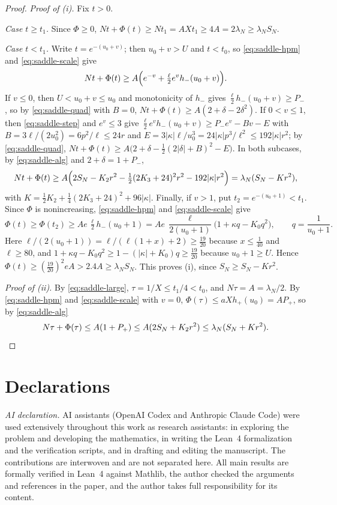 \documentclass[11pt]{article}
\theoremstyle{remark}
\begin{document}
\begin{proof}
\emph{Proof of (i).} Fix $t>0$.

\emph{Case $t\ge t_1$.} Since $\Phi\ge0$,
$Nt+\Phi(t)\ge Nt_1=AXt_1\ge4A=2\lambda_N\ge\lambda_NS_N$.

\emph{Case $t<t_1$.} Write $t=e^{-(u_0+v)}$; then $u_0+v>U$ and
$t<t_0$, so \eqref{eq:saddle-hpm} and \eqref{eq:saddle-scale} give
\[
  Nt+\Phi(t)\ge A\Bigl(e^{-v}+\tfrac\ell2e^vh_-(u_0+v)\Bigr).
\]
If $v\le0$, then $U<u_0+v\le u_0$ and monotonicity of $h_-$ gives
$\frac\ell2h_-(u_0+v)\ge P_-$, so by \eqref{eq:saddle-quad} with $B=0$,
$Nt+\Phi(t)\ge A(2+\delta-2\delta^2)$. If $0<v\le1$, then
\eqref{eq:saddle-step} and $e^v\le3$ give
$\frac\ell2e^vh_-(u_0+v)\ge P_-e^v-Bv-E$ with
$B=3\ell/(2u_0^2)=6p^2/\ell\le24r$ and
$E=3|\kappa|\ell/u_0^3=24|\kappa|p^3/\ell^2\le192|\kappa|r^2$; by
\eqref{eq:saddle-quad},
$Nt+\Phi(t)\ge A\bigl(2+\delta-\frac12(2|\delta|+B)^2-E\bigr)$. In both
subcases, by \eqref{eq:saddle-alg} and $2+\delta=1+P_-$,
\[
  Nt+\Phi(t)\ge A\Bigl(2S_N-K_2r^2-\tfrac12(2K_3+24)^2r^2
  -192|\kappa|r^2\Bigr)=\lambda_N(S_N-Kr^2),
\]
with $K=\frac12K_2+\frac14(2K_3+24)^2+96|\kappa|$. Finally, if $v>1$,
put $t_2=e^{-(u_0+1)}<t_1$. Since $\Phi$ is nonincreasing,
\eqref{eq:saddle-hpm} and \eqref{eq:saddle-scale} give
\[
  \Phi(t)\ge\Phi(t_2)\ge Ae\,\tfrac\ell2h_-(u_0+1)
  =Ae\,\frac{\ell}{2(u_0+1)}\bigl(1+\kappa q-K_0q^2\bigr),
  \qquad q=\frac1{u_0+1}.
\]
Here $\ell/(2(u_0+1))=\ell/(\ell(1+x)+2)\ge\frac{19}{20}$ because
$x\le\frac1{40}$ and $\ell\ge80$, and
$1+\kappa q-K_0q^2\ge1-(|\kappa|+K_0)q\ge\frac{19}{20}$ because
$u_0+1\ge U$. Hence $\Phi(t)\ge(\frac{19}{20})^2eA>2.4A\ge\lambda_NS_N$.
This proves (i), since $S_N\ge S_N-Kr^2$.

\emph{Proof of (ii).} By \eqref{eq:saddle-large},
$\tau=1/X\le t_1/4<t_0$, and $N\tau=A=\lambda_N/2$. By
\eqref{eq:saddle-hpm} and \eqref{eq:saddle-scale} with $v=0$,
$\Phi(\tau)\le aXh_+(u_0)=AP_+$, so by \eqref{eq:saddle-alg}
\[
  N\tau+\Phi(\tau)\le A(1+P_+)\le A(2S_N+K_2r^2)
  \le\lambda_N(S_N+Kr^2). \qedhere
\]
\end{proof}

\section*{Declarations}
\emph{AI declaration.} AI assistants (OpenAI Codex and Anthropic Claude
Code) were used extensively throughout this work as research assistants:
in exploring the problem and developing the mathematics, in writing the
Lean~4 formalization and the verification scripts, and in drafting and
editing the manuscript. The contributions are interwoven and are not
separated here. All main results are formally verified in Lean~4 against
Mathlib, the author checked the arguments and references in the paper,
and the author takes full responsibility for its content.
\end{document}
